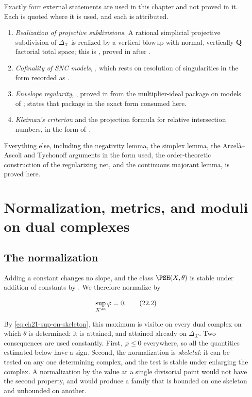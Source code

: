 Exactly four external statements are used in this chapter and not proved in
it.  Each is quoted where it is used, and each is attributed.

\begin{enumerate}
\item \emph{Realization of projective subdivisions.}  A rational simplicial
projective subdivision of \(\Delta_{\mathcal X}\) is realized by a vertical
blowup with normal, vertically \(\mathbf Q\)-factorial total space; this is
, proved in  after
\cite[Theorem~3.15]{BFJ16}.
\item \emph{Cofinality of SNC models}, , which rests
on resolution of singularities in the form recorded as
.
\item \emph{Envelope regularity}, , proved
in  from the multiplier-ideal package on models of
\cite[Appendix~B]{BFJ16};  states that package in
the exact form consumed here.
\item \emph{Kleiman's criterion} and the projection formula for relative
intersection numbers, in the form of
.
\end{enumerate}

Everything else, including the negativity lemma, the simplex lemma, the
Arzel\`a--Ascoli and Tychonoff arguments in the form used, the
order-theoretic construction of the regularizing net, and the continuous
majorant lemma, is proved here.

\section{Normalization, metrics, and moduli on dual complexes}
\label{sec:ch22-moduli}

\subsection{The normalization}

Adding a constant changes no slope, and the class \(\PSH(X,\theta)\) is
stable under addition of constants by
.  We therefore normalize by

\[
                         \sup_{X^{\An}}\varphi=0.
\tag{22.2}\label{eq:ch22-normalization}
\]

By \eqref{eq:ch21-sup-on-skeleton}, this maximum is visible on every dual
complex on which \(\theta\) is determined: it is attained, and attained
already on \(\Delta_{\mathcal X}\).  Two consequences are used constantly.
First, \(\varphi\leq0\) everywhere, so all the quantities estimated below
have a sign.  Second, the normalization is \emph{skeletal}: it can be tested
on any one determining complex, and the test is stable under enlarging the
complex.  A normalization by the value at a single divisorial point would
not have the second property, and would produce a family that is bounded on
one skeleton and unbounded on another.


